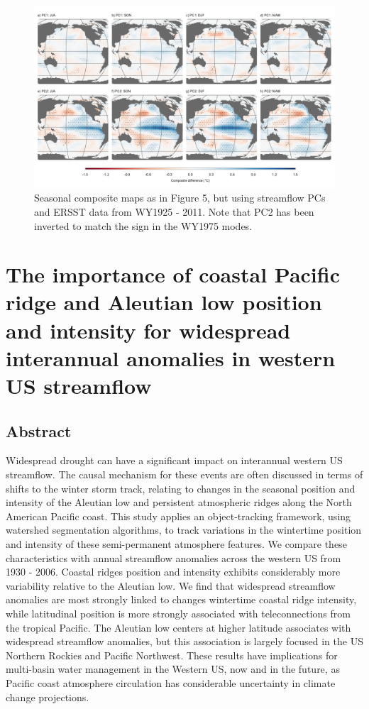 \documentclass[final, double]{ua-thesis}
\begin{document}
\begin{figure}[ht]
\centering
\centerline{\includegraphics[width=190mm]{p1figures/s8.pdf}}
\caption{Seasonal composite maps as in Figure 5, but using streamflow PCs and ERSST data from WY1925 - 2011. Note that PC2 has been inverted to match the sign in the WY1975 modes.}
\label{sfig:compsst}
\end{figure}


\chapter{The importance of coastal Pacific ridge and Aleutian low position and intensity for widespread interannual anomalies in western US streamflow}

\section{Abstract}

Widespread drought can have a significant impact on interannual western US streamflow. The causal mechanism for these events are often discussed in terms of shifts to the winter storm track, relating to changes in the seasonal position and intensity of the Aleutian low and persistent atmospheric ridges along the North American Pacific coast. This study applies an object-tracking framework, using watershed segmentation algorithms, to track variations in the wintertime position and intensity of these semi-permanent atmosphere features. We compare these characteristics with annual streamflow anomalies across the western US from 1930 - 2006. Coastal ridges position and intensity exhibits considerably more variability relative to the Aleutian low. We find that widespread streamflow anomalies are most strongly linked to changes wintertime coastal ridge intensity, while latitudinal position is more strongly associated with teleconnections from the tropical Pacific. The Aleutian low centers at higher latitude associates with widespread streamflow anomalies, but this association is largely focused in the US Northern Rockies and Pacific Northwest. These results have implications for multi-basin water management in the Western US, now and in the future, as Pacific coast atmosphere circulation has considerable uncertainty in climate change projections.
\end{document}
